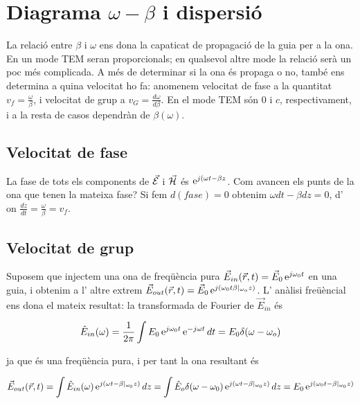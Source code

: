 \section{Diagrama $\omega - \beta$ i dispersió}

La relació entre $\beta$ i $\omega$ ens dona la capaticat de propagació de la guia per a la ona. En un mode TEM seran proporcionals; en qualsevol altre mode la relació serà un poc més complicada. A més de determinar si la ona és propaga o no, també ens determina a quina velocitat ho fa: anomenem velocitat de fase a la quantitat $v_f = \frac{\omega}{\beta}$, i velocitat de grup a $v_G = \frac{d\omega}{d\beta{}}$. En el mode TEM són $0$ i $c$, respectivament, i a la resta de casos dependràn de $\beta(\omega)$.

\subsection{Velocitat de fase}

La fase de tots els components de $\vec{\mathcal{E}}$ i $\vec{\mathcal{H}}$ és $\operatorname{e}^{j(\omega t - \beta z}$. Com avancen els punts de la ona que tenen la mateixa fase? Si fem $d(fase) = 0$ obtenim $\omega dt - \beta dz = 0$, d' on $\frac{dz}{dt} = \frac{\omega}{\beta} = v_f$.

\subsection{Velocitat de grup}

Suposem que injectem una ona de freqüència pura  $\vec E_{in} (\vec r, t) = \vec E_0  \operatorname{e}^{j \omega_0 t}$ en una guia, i obtenim a l' altre extrem $\vec E_{out} (\vec r, t) = \vec E_0 \operatorname{e}^{j(\omega_0 t \beta \vert_{\omega _o} z)}$.  L' anàlisi freüèncial ens dona el mateix resultat: la transformada de Fourier de $\vec E_{in}$ és

\begin{equation}
  \hat E_{in} (\omega) = \frac{1}{2\pi} \int E_0 \operatorname{e}^{j\omega_0 t} \operatorname{e}^{-j \omega t} dt = E_0 \delta (\omega - \omega_o)
\end{equation}

ja que és una freqüència pura, i per tant la ona resultant és

\begin{equation} 
  \vec E_{out} (\vec r, t) = 
  \int \hat E_{in} (\omega) \operatorname{e}^{j(\omega t - \beta \vert_{\omega _0} z)} dz =  
  \int \hat E_{o} \delta (\omega - \omega _0) \operatorname{e}^{j(\omega t - \beta \vert_{\omega _0} z)} dz = 
  E_0 \operatorname{e}^{j(\omega_0 t - \beta \vert_{\omega _0} z)} 
\end{equation}

